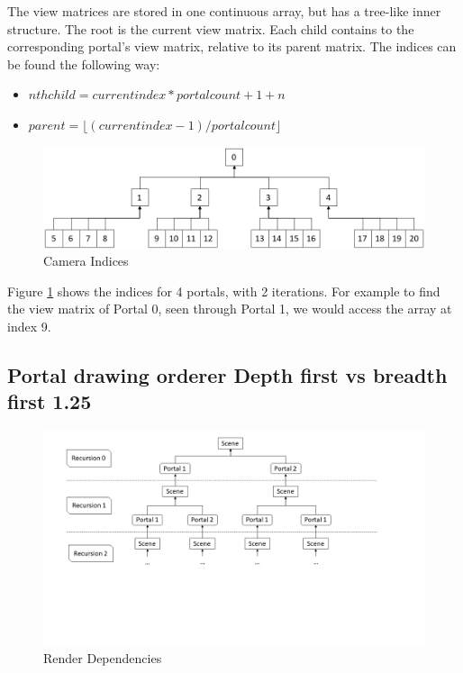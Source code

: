 The view matrices are stored in one continuous array, but has a tree-like inner structure. The root is the current view matrix. Each child contains to the corresponding portal's view matrix, relative to its parent matrix. The indices can be found the following way:

\begin{itemize}
	\item $ nth child = current index * portalcount + 1 + n$
	\item $ parent = \lfloor(current index-1)/portal count\rfloor $
\end{itemize}





\begin{figure}[h]
	\includegraphics[width=\linewidth]{images/cameraindices.png}
	\caption{Camera Indices}
	\label{fig:cameraindices}
\end{figure}

Figure \ref{fig:cameraindices} shows the indices for 4 portals, with 2 iterations. For example to find the view matrix of Portal 0, seen through Portal 1, we would access the array at index 9.


\subsection{Portal drawing orderer Depth first vs breadth first 1.25}

\begin{figure}[h]
	\includegraphics[width=\linewidth]{images/rendertree.png}
	\caption{Render Dependencies}
	\label{fig:rendertree}
\end{figure}

